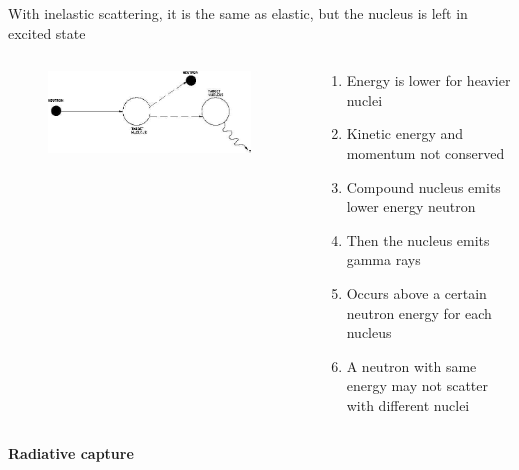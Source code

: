 \documentclass[aspectratio=1610,pdftex,dvipsnames,compress,xcolor={dvipsnames}]{beamer}
\begin{document}
\addtocounter{framenumber}{-1} 
\begin{frame}{With inelastic scattering, it is the same as elastic, but the nucleus is left in excited state}
    \begin{columns}[t]

        \begin{column}{0.50\textwidth}
            \begin{figure}
                \centering
                \includegraphics[width=0.95\textwidth]{inelastic.scattering.jpg}
            \end{figure}
        \end{column}

        \begin{column}{0.50\textwidth}
            \begin{enumerate}[series=outerlist,topsep=0pt,itemsep=12pt,leftmargin=*,label=(\arabic*)]
                \item[]Energy is lower for heavier nuclei
                \item[]Kinetic energy and momentum not conserved
                \item[]Compound nucleus emits lower energy neutron
                \item[]Then the nucleus emits gamma rays
                \item[]Occurs above a certain neutron energy for each nucleus
                \item[]A neutron with same energy may not scatter with different nuclei
            \end{enumerate}
        \end{column}

    \end{columns}
\end{frame}


\begin{frame}[plain]{}
    \centering\LARGE\textbf{Radiative capture}
\end{frame}
\end{document}
